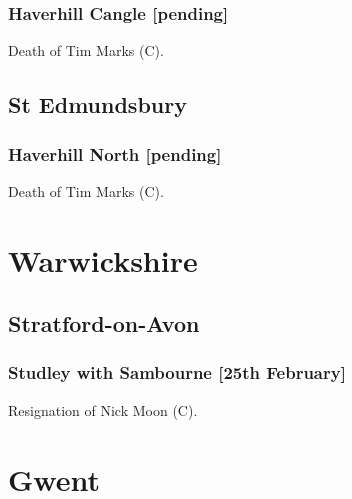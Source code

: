 \documentclass[a4paper,openany]{book}
\begin{document}
\begin{resultsiii}
\subsubsection*{Haverhill Cangle \hspace*{\fill}\nolinebreak[1]%
\enspace\hspace*{\fill}
[pending]}


Death of Tim Marks (C).

\subsection*{St Edmundsbury}

\subsubsection*{Haverhill North \hspace*{\fill}\nolinebreak[1]%
\enspace\hspace*{\fill}
[pending]}


Death of Tim Marks (C).

\section{Warwickshire}

\subsection*{Stratford-on-Avon}

\subsubsection*{Studley with Sambourne \hspace*{\fill}\nolinebreak[1]%
\enspace\hspace*{\fill}
[25th February]}


Resignation of Nick Moon (C).

\section{Gwent}


\end{resultsiii}
\end{document}
